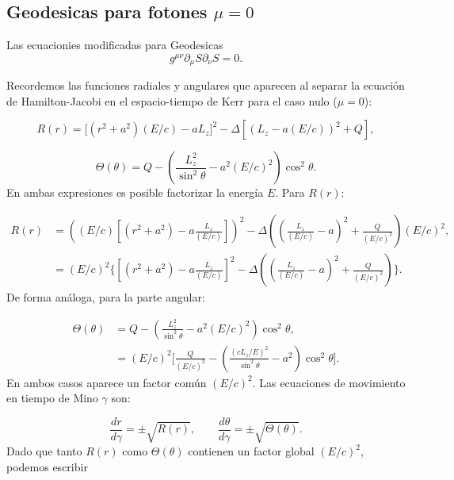 \subsection{Geodesicas para fotones $\mu =0 $}
Las ecuacionies modificadas para Geodesicas
\begin{equation}
    g^{\mu \nu} \partial_\mu S \partial_\nu S= 0.
\end{equation}


Recordemos las funciones radiales y angulares que aparecen al separar la ecuación de Hamilton-Jacobi en el espacio-tiempo de Kerr para el caso nulo (\(\mu=0\)):

\begin{equation}
    R(r) = \big[(r^2+a^2)(E/c) - aL_z\big]^2 - \Delta \left[ (L_z - a(E/c))^2 + Q \right],
\end{equation}

\begin{equation}
    \Theta(\theta) = Q - \left( \frac{L_z^2}{\sin^2\theta} - a^2(E/c)^2 \right)\cos^2\theta.
\end{equation}
En ambas expresiones es posible factorizar la energía \(E\). Para \(R(r)\):

\begin{align}
    R(r) & = \left( (E/c) \left[ (r^2+a^2) - a\frac{L_z}{ (E/c) } \right]\right)^2
    - \Delta\left( \left(\frac{L_z}{(E/c)}-a\right)^2 + \frac{Q}{(E/c)^2} \right) (E/c)^2, \\
         & = (E/c)^2 \Bigg\{ \left[ (r^2+a^2) - a\frac{L_z}{(E/c)} \right]^2
    - \Delta\left( \left(\frac{L_z}{(E/c)}-a\right)^2 + \frac{Q}{(E/c)^2} \right) \Bigg\}.
\end{align}
De forma análoga, para la parte angular:

\begin{align}
    \Theta(\theta) & = Q - \left( \frac{L_z^2}{\sin^2\theta} - a^2 (E/c) ^2 \right)\cos^2\theta, \\
                   & = (E/c)^2 \Bigg[ \frac{Q}{(E/c)^2}
        - \left( \frac{(c L_z/E)^2}{\sin^2\theta} - a^2 \right)\cos^2\theta \Bigg].
\end{align}
En ambos casos aparece un factor común \((E/c)^2\).
Las ecuaciones de movimiento en tiempo de Mino \(\gamma\) son:

\begin{equation}
    \frac{dr}{d\gamma} = \pm \sqrt{R(r)}, \qquad
    \frac{d\theta}{d\gamma} = \pm \sqrt{\Theta(\theta)}.
\end{equation}
Dado que tanto \(R(r)\) como \(\Theta(\theta)\) contienen un factor global \((E/c)^2\),
podemos escribir

